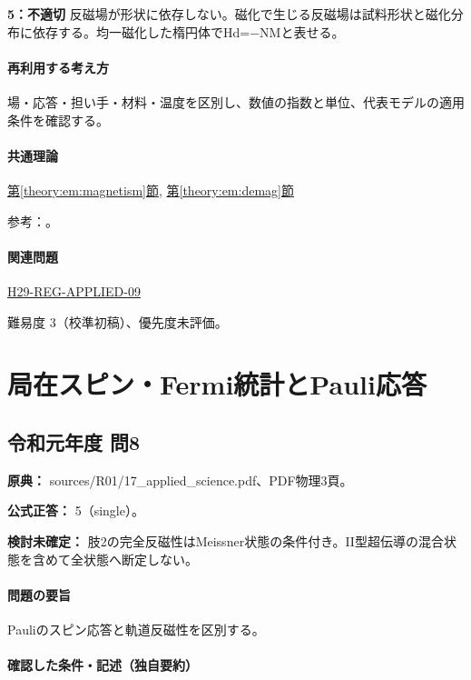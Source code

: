 \noindent\textbf{5：不適切} 反磁場が形状に依存しない。磁化で生じる反磁場は試料形状と磁化分布に依存する。均一磁化した楕円体でHd=−NMと表せる。\par

\paragraph{再利用する考え方} 場・応答・担い手・材料・温度を区別し、数値の指数と単位、代表モデルの適用条件を確認する。

\paragraph{共通理論} \hyperref[theory:em:magnetism]{第\ref*{theory:em:magnetism}節}, \hyperref[theory:em:demag]{第\ref*{theory:em:demag}節}

\par 参考：\cite{openstax_magnetism,em51_pauli,em51_demag}。

\paragraph{関連問題} \hyperref[q:h29-reg-applied-09]{H29-REG-APPLIED-09}

\par 難易度 3（校準初稿）、優先度未評価。

\section{局在スピン・Fermi統計とPauli応答}

\subsection{令和元年度 問8}
\label{q:r01-reg-applied-08}

\noindent\textbf{原典：} sources/R01/17\_applied\_science.pdf、PDF物理3頁。

\textbf{公式正答：} 5（single）。

\par\textbf{検討未確定：} 肢2の完全反磁性はMeissner状態の条件付き。II型超伝導の混合状態を含めて全状態へ断定しない。

\paragraph{問題の要旨} Pauliのスピン応答と軌道反磁性を区別する。

\paragraph{確認した条件・記述（独自要約）}\mbox{}\par

